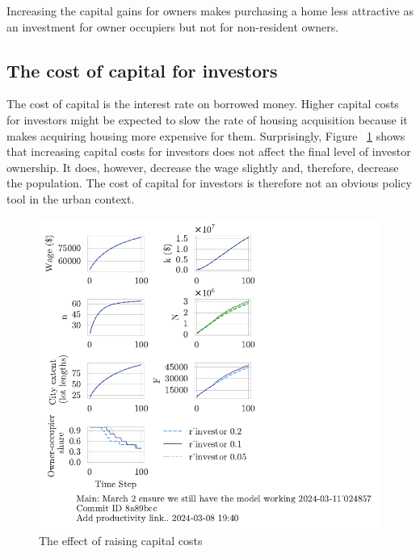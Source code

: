 Increasing the capital gains for owners makes purchasing a home less attractive as an investment for owner occupiers but not for non-resident owners. %


\newpage

\subsection{The cost of capital for investors}

The cost of capital is the interest rate on borrowed money. Higher capital costs for investors might be expected to slow the rate of housing acquisition because it makes acquiring housing more expensive for them. Surprisingly,  Figure ~\ref{fig:capital_ownership_trajectory} shows that increasing capital costs for investors does not affect the final level of investor ownership.  It does, however, decrease the wage slightly and, therefore, decrease the population. The cost of capital for investors is therefore not an obvious policy tool in the urban context.

\begin{figure}[h!b]
    \centering
    \includegraphics[scale=1., trim={0 1.4cm 0 0},clip]{fig/r_investor-Main-024857.pdf}
    \caption{The effect of raising capital costs}
    \label{fig:capital_ownership_trajectory}
\end{figure}



